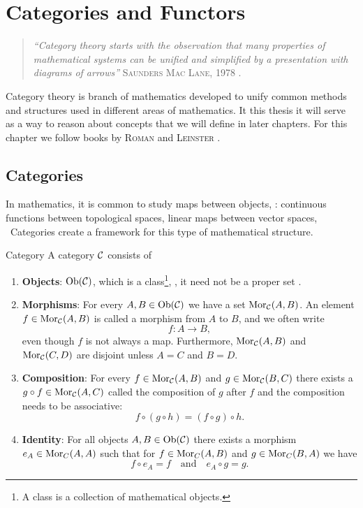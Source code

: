 \chapter{Categories and Functors}
\label{chapter__category_theory}

\begin{quote}
\textit{``Category theory starts with the observation that many properties of mathematical systems can be unified and simplified by a presentation with diagrams of arrows''} \hfill \textsc{Saunders Mac Lane}, 1978 \cite[p.~1]{MacLane1978}. \hspace*{5mm}
\end{quote}

Category theory is branch of mathematics developed to unify common methods and structures used in different areas of mathematics. 
It this thesis it will serve as a way to reason about concepts that we will define in later chapters. For this chapter we follow books by \textsc{Roman} \cite{Roman2017} and \textsc{Leinster} \cite{Leinster2014-dc}.

\section{Categories}

In mathematics, it is common to study maps between objects, \eg: continuous functions between topological spaces, linear maps between vector spaces, \etc\
Categories create a framework for this type of mathematical structure.

\begin{definition}{Category \cite[Sec.~1.2]{Roman2017}}{}
A category $\mathcal{C}$ consists of
\begin{enumerate}
    \item \textbf{Objects}: $\mathrm {Ob}(\mathcal{C})$, which is a class\footnote{A class is a collection of mathematical objects.}, \ie, it need not be a proper set \cite[p.~1]{Roman2017}.
    
    \item \textbf{Morphisms}: For every $A, B \in \mathrm {Ob}(\mathcal{C})$ we have a set $\mathrm {Mor}_{\mathcal{C}}(A,B)$. An element $f \in \mathrm {Mor}_{\mathcal{C}}(A,B)$ is called a morphism from $A$ to $B$, and we often write 
    $$
    f\colon A \to B,
    $$
    even though $f$ is not always a map. Furthermore, $\mathrm {Mor}_{\mathcal{C}}(A,B)$ and $\mathrm {Mor}_{\mathcal{C}}(C,D)$ are disjoint unless $A = C$ and $B = D$.
    
    \item \textbf{Composition}: For every $f \in \mathrm {Mor}_{\mathcal{C}}(A,B)$ and $g \in \mathrm {Mor}_{\mathcal{C}}(B,C)$ there exists a $g \circ f \in \mathrm {Mor}_{\mathcal{C}}(A,C)$ called the composition of $g$ after $f$ and the composition needs to be associative: 
    $$
    f \circ (g \circ h) = (f \circ g) \circ h.
    $$

    \item \textbf{Identity}: For all objects $A,B \in \mathrm {Ob}(\mathcal{C})$ there exists a morphism ${e_A \in \mathrm {Mor}_C(A,A)}$ such that for $f \in \mathrm {Mor}_C(A,B)$ and $g \in \mathrm {Mor}_C(B,A)$ we have
    $$
    f \circ e_A = f \quad \text{and} \quad e_A \circ g = g.
    $$
\end{enumerate}
\end{definition}

